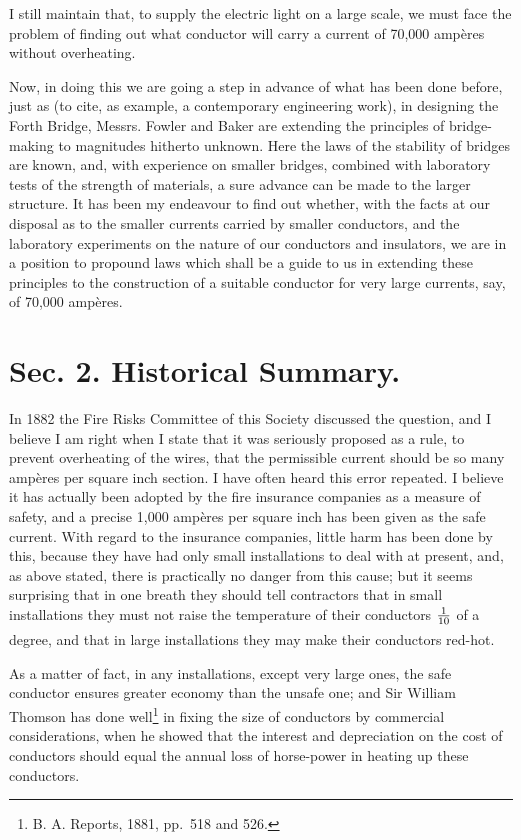 \documentclass[12pt,oneside]{book}[2021/10/04]
\newcommand{\xpa}{\rule[-1.6ex]{0pt}{3.4ex}}
\begin{document}
I still maintain that, to supply the electric light on a large
scale, we must face the problem of finding out what conductor
will carry a current of 70,000 ampères without overheating.

Now, in doing this we are going a step in advance of what has
been done before, just as (to cite, as example, a contemporary
engineering work), in designing the Forth Bridge, Messrs. Fowler
and Baker are extending the principles of bridge-making to
magnitudes hitherto unknown. Here the laws of the stability of
bridges are known, and, with experience on smaller bridges,
combined with laboratory tests of the strength of materials, a
sure advance can be made to the larger structure. It has been
my endeavour to find out whether, with the facts at our disposal
as to the smaller currents carried by smaller conductors, and the
laboratory experiments on the nature of our conductors and
insulators, we are in a position to propound laws which shall be a
guide to us in extending these principles to the construction of a
suitable conductor for very large currents, say, of 70,000 ampères.


\section*{Sec. 2. Historical Summary.}

In 1882 the Fire Risks Committee of this Society discussed
the question, and I believe I am right when I state that it was
seriously proposed as a rule, to prevent overheating of the wires,
that the permissible current should be so many ampères per
square inch section. I have often heard this error repeated. I
believe it has actually been adopted by the fire insurance companies
as a measure of safety, and a precise 1,000 ampères per
square inch has been given as the safe current. With regard to
the insurance companies, little harm has been done by this,
because they have had only small installations to deal with at
present, and, as above stated, there is practically no danger from
this cause; but it seems surprising that in one breath they
should tell contractors that in small installations they must not
raise the temperature of their conductors \(\xpa\frac{1}{10}\) of a degree, and
that in large installations they may make their conductors red-hot.

As a matter of fact, in any installations, except very large
ones, the safe conductor ensures greater economy than the unsafe
one; and Sir William Thomson has done well\footnote
  {B. A. Reports, 1881, pp.\ 518 and 526.}
in fixing the size
of conductors by commercial considerations, when he showed
that the interest and depreciation on the cost of conductors
should equal the annual loss of horse-power in heating up these
conductors.
\end{document}
